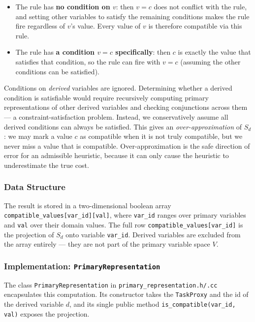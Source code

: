 \documentclass[11pt,a4paper]{article}
\begin{document}
\begin{itemize}
  \item The rule has \textbf{no condition on $v$}: then $v = c$ does not
        conflict with the rule, and setting other variables to satisfy the
        remaining conditions makes the rule fire regardless of $v$'s value.
        Every value of $v$ is therefore compatible via this rule.
  \item The rule has \textbf{a condition $v = c$ specifically}: then $c$ is
        exactly the value that satisfies that condition, so the rule can fire
        with $v = c$ (assuming the other conditions can be satisfied).
\end{itemize}

Conditions on \emph{derived} variables are ignored.  Determining whether a
derived condition is satisfiable would require recursively computing primary
representations of other derived variables and checking conjunctions across
them — a constraint-satisfaction problem.  Instead, we conservatively assume
all derived conditions can always be satisfied.  This gives an
\emph{over-approximation} of $S_d$: we may mark a value $c$ as compatible
when it is not truly compatible, but we never miss a value that is compatible.
Over-approximation is the safe direction of error for an admissible heuristic,
because it can only cause the heuristic to underestimate the true cost.

\subsubsection{Data Structure}

The result is stored in a two-dimensional boolean array
\texttt{compatible\_values[var\_id][val]}, where \texttt{var\_id} ranges over
primary variables and \texttt{val} over their domain values.  The full row
\texttt{compatible\_values[var\_id]} is the projection of $S_d$ onto variable
\texttt{var\_id}.  Derived variables are excluded from the array entirely —
they are not part of the primary variable space $V$.

\subsubsection{Implementation: \texttt{PrimaryRepresentation}}

The class \texttt{PrimaryRepresentation} in
\texttt{primary\_representation.h/.cc} encapsulates this computation.  Its
constructor takes the \texttt{TaskProxy} and the id of the derived variable
$d$, and its single public method \texttt{is\_compatible(var\_id, val)} exposes
the projection.
\end{document}
